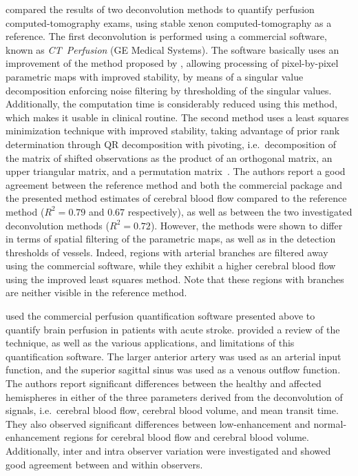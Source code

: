 \citet{Wintermark:2001bm} compared the results of two deconvolution methods to quantify perfusion computed-tomography exams, using stable xenon computed-tomography as a reference.
The first deconvolution is performed using a commercial software, known as \emph{CT~Perfusion} (GE Medical Systems).
The software basically uses an improvement of the method proposed by \citet{Cenic:1999un}, allowing processing of pixel-by-pixel parametric maps with improved stability, by means of a singular value decomposition enforcing noise filtering by thresholding of the singular values. 
Additionally, the computation time is considerably reduced using this method, which makes it usable in clinical routine.
The second method uses a least squares minimization technique with improved stability, taking advantage of prior rank determination through QR decomposition with pivoting, i.e.~decomposition of the matrix of shifted observations as the product of an orthogonal matrix, an upper triangular matrix, and a permutation matrix~\cite{Golub:100136}.
The authors report a good agreement between the reference method and both the commercial package and the presented method estimates of cerebral blood flow compared to the reference method ($R^2 = 0.79$ and $0.67$ respectively), as well as between the two investigated deconvolution methods ($R^2 = 0.72$).
However, the methods were shown to differ in terms of spatial filtering of the parametric maps, as well as in the detection thresholds of vessels.
Indeed, regions with arterial branches are filtered away using the commercial software, while they exhibit a higher cerebral blood flow using the improved least squares method.
Note that these regions with branches are neither visible in the reference method.

\citet{Eastwood:2002hx} used the commercial perfusion quantification software presented above to quantify brain perfusion in patients with acute stroke.
\citet{Hoeffner:2004hq} provided a review of the technique, as well as the various applications, and limitations of this quantification software.
The larger anterior artery was used as an arterial input function, and the superior sagittal sinus was used as a venous outflow function.
The authors report significant differences between the healthy and affected hemispheres in either of the three parameters derived from the deconvolution of signals, i.e.~cerebral blood flow, cerebral blood volume, and mean transit time.
They also observed significant differences between low-enhancement and normal-enhancement regions for cerebral blood flow and cerebral blood volume.
Additionally, inter and intra observer variation were investigated and showed good agreement between and within observers.

